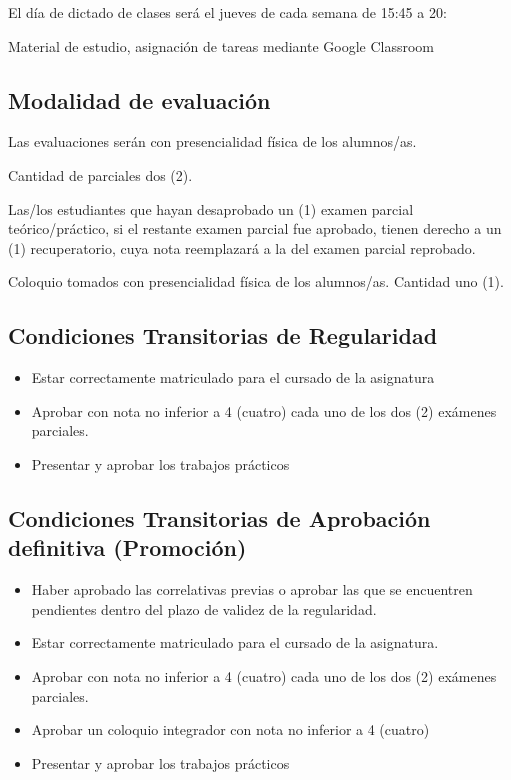 El día de dictado de clases será el jueves de cada semana de 15:45 a 20:

Material de estudio, asignación de tareas mediante Google Classroom


\subsection*{Modalidad de evaluación}

Las evaluaciones serán con presencialidad física de los alumnos/as.

Cantidad de parciales dos (2).

Las/los estudiantes que hayan desaprobado un (1) examen parcial teórico/práctico, si el restante examen parcial fue aprobado, tienen derecho a un (1) recuperatorio, cuya nota reemplazará a la del examen parcial reprobado.

Coloquio  tomados con presencialidad física de los alumnos/as. Cantidad uno (1).

\subsection*{Condiciones Transitorias de Regularidad}

\begin{itemize}
\item Estar correctamente matriculado para el cursado de la asignatura
\item Aprobar con nota no inferior a 4 (cuatro) cada uno de los  dos (2) exámenes parciales. 

\item Presentar y aprobar los trabajos prácticos
\end{itemize}

\subsection*{Condiciones Transitorias de Aprobación definitiva (Promoción) }


\begin{itemize}
\item Haber aprobado las correlativas previas o aprobar las que se encuentren pendientes dentro del plazo de validez de la regularidad.

\item  Estar correctamente matriculado para el cursado de la
  asignatura.
\item Aprobar con nota no inferior a 4 (cuatro) cada uno de los dos (2) exámenes parciales. 
\item Aprobar un coloquio integrador con nota no inferior a 4 (cuatro)
\item Presentar y aprobar los trabajos prácticos
\end{itemize}



